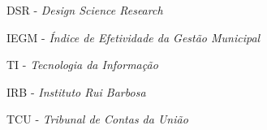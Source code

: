 \begin{siglas}
    \item DSR - \textit{Design Science Research}
    \item IEGM - \textit{Índice de Efetividade da Gestão Municipal}
    \item TI - \textit{Tecnologia da Informação}
    \item IRB - \textit{Instituto Rui Barbosa}
    \item TCU - \textit{Tribunal de Contas da União}
\end{siglas}